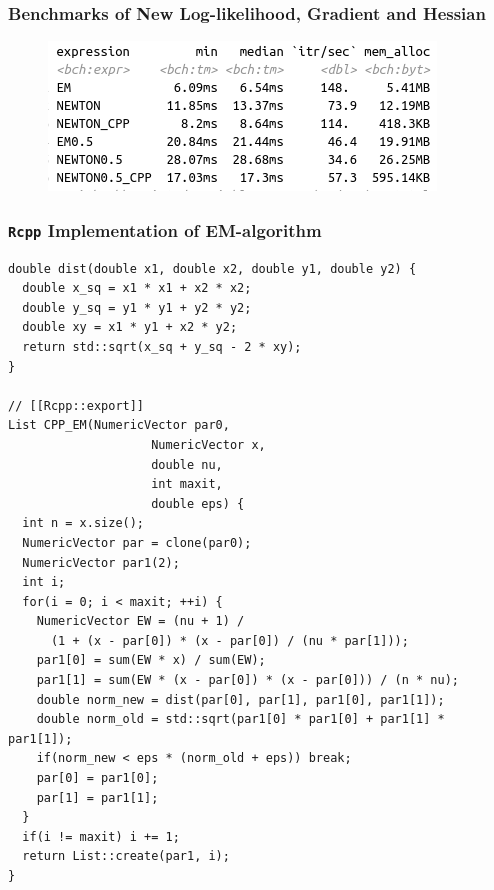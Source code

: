\documentclass[aspectratio=169]{beamer}
\begin{document}
\begin{frame}
    \frametitle{Benchmarks of New Log-likelihood, Gradient and Hessian}
    \begin{figure}
        \centering
        \includegraphics[scale = 0.6]{figure/CPPN_NewtonVsEm_table.png}
    \end{figure}
\end{frame}
\begin{frame}[fragile]
    \frametitle{\texttt{Rcpp} Implementation of EM-algorithm}
\begin{verbatim}
double dist(double x1, double x2, double y1, double y2) {
  double x_sq = x1 * x1 + x2 * x2;
  double y_sq = y1 * y1 + y2 * y2;
  double xy = x1 * y1 + x2 * y2;
  return std::sqrt(x_sq + y_sq - 2 * xy);
}

// [[Rcpp::export]]
List CPP_EM(NumericVector par0, 
                    NumericVector x, 
                    double nu,
                    int maxit,
                    double eps) {
  int n = x.size();
  NumericVector par = clone(par0);
  NumericVector par1(2);
  int i;
  for(i = 0; i < maxit; ++i) {
    NumericVector EW = (nu + 1) / 
      (1 + (x - par[0]) * (x - par[0]) / (nu * par[1]));
    par1[0] = sum(EW * x) / sum(EW);
    par1[1] = sum(EW * (x - par[0]) * (x - par[0])) / (n * nu);
    double norm_new = dist(par[0], par[1], par1[0], par1[1]);
    double norm_old = std::sqrt(par1[0] * par1[0] + par1[1] * par1[1]);
    if(norm_new < eps * (norm_old + eps)) break;
    par[0] = par1[0];
    par[1] = par1[1];
  }
  if(i != maxit) i += 1;
  return List::create(par1, i);
}
\end{verbatim}
\end{frame}
\end{document}
